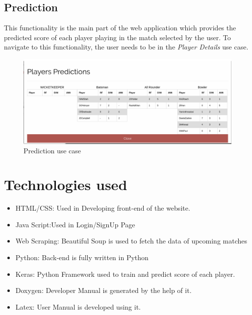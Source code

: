 \documentclass[12pt]{article}
\begin{document}
\subsection{Prediction}
\par This functionality is the main part of the web application which provides the predicted score of each player playing in the match selected by the user. To navigate to this functionality, the user needs to be in the \textit{Player Details} use case.
\begin{figure}[!h]
    \begin{center}
        \includegraphics[scale=0.2]{prediction.png}
    \end{center}
    \caption{Prediction use case}
\end{figure}
\newpage
\section{Technologies used}
\begin{itemize}
    \item HTML/CSS: Used in Developing front-end of the website.
    \item Java Script:Used in Login/SignUp Page 
    \item Web Scraping: Beautiful Soup is used to fetch the data of upcoming matches
    \item Python: Back-end is fully written in Python
    \item Keras: Python Framework used to train and predict score of each player.
    \item Doxygen: Developer Manual is generated by the help of it.
    \item Latex: User Manual is developed using it.
\end{itemize}

\newpage
\end{document}

